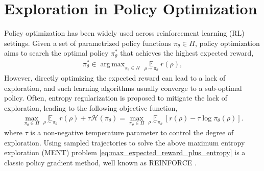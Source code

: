 \documentclass{article}
\DeclareMathOperator*\argmax{arg\,max}
\DeclareMathOperator*\ep{\mathbb{E}}
\begin{document}
\section{Exploration in Policy Optimization}

Policy optimization has been widely used across reinforcement learning (RL) settings. Given a set of parametrized policy functions $\pi_\theta \in \Pi$, policy optimization aims to search the optimal policy $\pi_\theta^*$ that achieves the highest expected reward,
\begin{equation}
\label{max_expected_reward}
\begin{split}
	\pi_\theta^* \in \argmax_{\pi_\theta \in \Pi}{ \ep\limits_{\rho \sim \pi_\theta}{r(\rho)} } ,
\end{split}
\end{equation}
However, directly optimizing the expected reward can lead to a lack of exploration, and such learning algorithms usually converge to a sub-optimal policy.
Often, entropy regularization is proposed to mitigate the lack of exploration, leading to the following objective function,
\begin{equation}
\label{eq:max_expected_reward_plus_entropy}
\begin{split}
\max\limits_{\pi_\theta \in \Pi}{ \ep\limits_{\rho \sim \pi_\theta}{  r(\rho) } + \tau \mathcal{H}(\pi_\theta) } = 
\max\limits_{\pi_\theta \in \Pi}{ \ep\limits_{\rho \sim \pi_\theta}{ \left[ r(\rho) - \tau \log{\pi_\theta(\rho)} \right] } }.
\end{split}
\end{equation}
where $\tau$ is a non-negative temperature parameter to control the degree of exploration. Using sampled trajectories to solve the above maximum entropy exploration (MENT) problem \cref{eq:max_expected_reward_plus_entropy} is a classic policy gradient method, well known as REINFORCE \cite{williams1992simple,williams1991function}.
\end{document}
